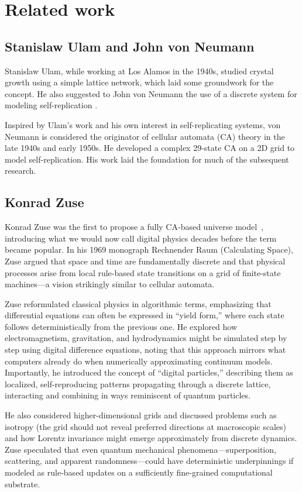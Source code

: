 \documentclass[12pt,english]{article}
\begin{document}
\section{Related work} \label{sec:related-work}

\subsection*{Stanislaw Ulam and John von Neumann}
Stanislaw Ulam, while working at Los Alamos in the 1940s, studied crystal growth using a simple lattice network, which laid some groundwork for the concept. He also suggested to John von Neumann the use of a discrete system for modeling self-replication \cite{ulam1952,vonNeumann1966}.

Inspired by Ulam's work and his own interest in self-replicating systems, von Neumann is considered the originator of cellular automata (CA) theory in the late 1940s and early 1950s. He developed a complex 29-state CA on a 2D grid to model self-replication. His work laid the foundation for much of the subsequent research.

\subsection*{Konrad Zuse}
Konrad Zuse was the first to propose a fully CA-based universe model~\cite{zuse}, introducing what we would now call digital physics decades before the term became popular. In his 1969 monograph Rechnender Raum (Calculating Space), Zuse argued that space and time are fundamentally discrete and that physical processes arise from local rule-based state transitions on a grid of finite-state machines—a vision strikingly similar to cellular automata.

Zuse reformulated classical physics in algorithmic terms, emphasizing that differential equations can often be expressed in “yield form,” where each state follows deterministically from the previous one. He explored how electromagnetism, gravitation, and hydrodynamics might be simulated step by step using digital difference equations, noting that this approach mirrors what computers already do when numerically approximating continuum models. Importantly, he introduced the concept of “digital particles,” describing them as localized, self-reproducing patterns propagating through a discrete lattice, interacting and combining in ways reminiscent of quantum particles.

He also considered higher-dimensional grids and discussed problems such as isotropy (the grid should not reveal preferred directions at macroscopic scales) and how Lorentz invariance might emerge approximately from discrete dynamics. Zuse speculated that even quantum mechanical phenomena—superposition, scattering, and apparent randomness—could have deterministic underpinnings if modeled as rule-based updates on a sufficiently fine-grained computational substrate.
\end{document}
